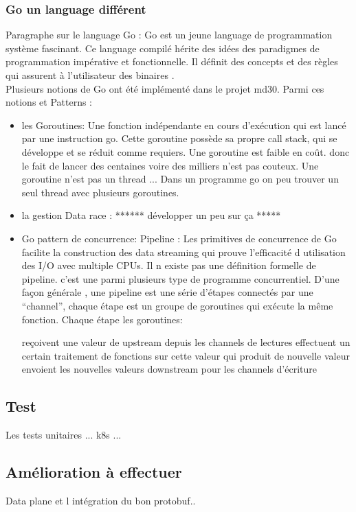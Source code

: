         \subsubsection{Go un language différent}
       
        Paragraphe sur le language Go : 
        Go est un jeune language de programmation système
        fascinant. Ce language compilé hérite des idées des paradigmes de
        programmation impérative et fonctionnelle. Il définit des concepts et
        des règles qui assurent à l'utilisateur des binaires .\\[0.3cm]
       
      
        Plusieurs notions de Go ont été implémenté dans le projet \gls{md30}. Parmi ces notions et Patterns :

        \begin{itemize}
            \item les Goroutines: Une fonction indépendante en cours d'exécution qui est lancé par une instruction go. 
            Cette goroutine possède sa propre call stack, qui se développe et se réduit comme requiers.
            Une goroutine est faible en coût. donc le fait de lancer des centaines voire des milliers n'est pas couteux.
            Une goroutine n'est pas un thread ... Dans un programme go on peu trouver un seul thread avec plusieurs goroutines.\\

            \item la gestion Data race : ****** développer un peu sur ça ***** \\

            \item Go pattern de concurrence: Pipeline : Les primitives de concurrence de Go facilite la construction 
            des data streaming qui prouve l’efficacité d utilisation des I/O avec multiple CPUs. 
            Il n existe pas une définition formelle de pipeline. c’est une parmi plusieurs type de programme concurrentiel. D'une façon générale , une pipeline est une série d’étapes connectés par une “channel”, chaque étape est un groupe de goroutines qui exécute la même fonction. 
            Chaque étape les goroutines:

                    reçoivent une valeur de upstream depuis les channels de lectures
                    effectuent un certain traitement de fonctions sur cette valeur qui produit de nouvelle valeur 
                    envoient les nouvelles valeurs downstream pour les channels d’écriture



        \end{itemize}

    \subsection{Test }
       

    Les tests unitaires ... 
    k8s ... 

    \subsection{Amélioration à effectuer}
        Data plane et l intégration du bon protobuf.. 
        
